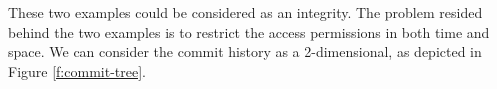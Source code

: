\iffalse
\fi



These two examples could be considered as an integrity. The problem resided
behind the two examples is to restrict the access permissions in both time and
space. We can consider the commit history as a 2-dimensional, as depicted
in Figure \ref{f:commit-tree}.





